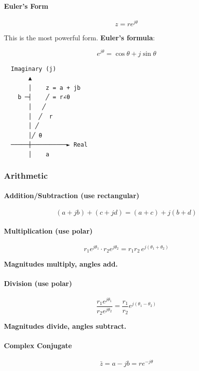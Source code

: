 \documentclass[11pt,a4paper]{book}
\begin{document}
\paragraph{Euler's Form}

\[z = r e^{j\theta}\]

This is the most powerful form. \textbf{Euler's formula}:

\[e^{j\theta} = \cos\theta + j\sin\theta\]

\begin{lstlisting}
  Imaginary (j)
       ▲
       │    z = a + jb
    b ─┤    ╱ = r∠θ
       │   ╱
       │  ╱  r
       │ ╱
       │╱ θ
  ─────┼──────────► Real
       │    a
\end{lstlisting}

\medskip\noindent\hrulefill\medskip

\subsubsection{Arithmetic}

\paragraph{Addition/Subtraction (use rectangular)}

\[(a + jb) + (c + jd) = (a+c) + j(b+d)\]

\paragraph{Multiplication (use polar)}

\[r_1 e^{j\theta_1} \cdot r_2 e^{j\theta_2} = r_1 r_2 \, e^{j(\theta_1 + \theta_2)}\]

\textbf{Magnitudes multiply, angles add.}

\paragraph{Division (use polar)}

\[\frac{r_1 e^{j\theta_1}}{r_2 e^{j\theta_2}} = \frac{r_1}{r_2} e^{j(\theta_1 - \theta_2)}\]

\textbf{Magnitudes divide, angles subtract.}

\paragraph{Complex Conjugate}

\[\bar{z} = a - jb = r e^{-j\theta}\]
\end{document}
